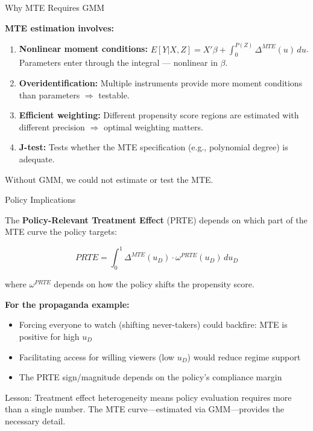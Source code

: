 \documentclass[aspectratio=169, handout]{beamer}
\numberwithin{equation}{section}
\begin{document}
\begin{frame}{Why MTE Requires GMM}

\textbf{MTE estimation involves:}

\begin{enumerate}
\item \textbf{Nonlinear moment conditions:} $E[Y | X, Z] = X'\beta + \int_0^{P(Z)} \Delta^{MTE}(u)\, du$. Parameters enter through the integral --- nonlinear in $\beta$.

\smallskip
\item \textbf{Overidentification:} Multiple instruments provide more moment conditions than parameters $\Rightarrow$ testable.

\smallskip
\item \textbf{Efficient weighting:} Different propensity score regions are estimated with different precision $\Rightarrow$ optimal weighting matters.

\smallskip
\item \textbf{J-test:} Tests whether the MTE specification (e.g., polynomial degree) is adequate.
\end{enumerate}

\smallskip
\alert{Without GMM, we could not estimate or test the MTE.}

\end{frame}

\begin{frame}{Policy Implications}

The \textbf{Policy-Relevant Treatment Effect} (PRTE) depends on which part of the MTE curve the policy targets:

$$PRTE = \int_0^1 \Delta^{MTE}(u_D) \cdot \omega^{PRTE}(u_D)\, du_D$$

where $\omega^{PRTE}$ depends on how the policy shifts the propensity score.

\smallskip
\textbf{For the propaganda example:}
\begin{itemize}\itemsep=1pt
\item Forcing everyone to watch (shifting never-takers) could \alert{backfire}: MTE is positive for high $u_D$
\item Facilitating access for willing viewers (low $u_D$) would reduce regime support
\item The PRTE sign/magnitude depends on the policy's compliance margin
\end{itemize}

\smallskip
\alert{Lesson:} Treatment effect heterogeneity means policy evaluation requires more than a single number. The MTE curve---estimated via GMM---provides the necessary detail.

\end{frame}
\end{document}
